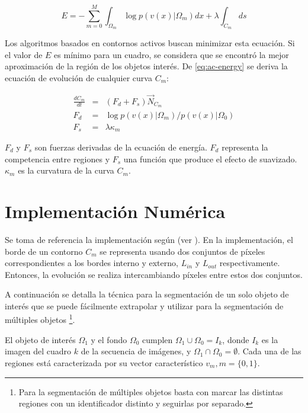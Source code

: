 \begin{equation}
    \label{eq:ac-energy}
    E = - \sum_{m=0}^{M}{\int_{\Omega_m}{\log{p(v(x) \vert \Omega_m)} dx} + \lambda \int_{C_m}{ds}}
\end{equation}

Los algoritmos basados en contornos activos buscan minimizar esta ecuación. Si
el valor de $E$ es mínimo para un cuadro, se considera que se encontró la mejor
aproximación de la región de los objetos interés. De \ref{eq:ac-energy} se
deriva la ecuación de evolución de cualquier curva $C_m$:

\begin{eqnarray}
    \frac{dC_m}{dt} &=& (F_d + F_s) \overrightarrow{N}_{C_m} \\
    F_d &=& \log{p(v(x) \vert \Omega_m) / p(v(x) \vert \Omega_0)} \\
    F_s &=& \lambda \kappa_m \label{eq:ac-formal}
\end{eqnarray}

$F_d$ y $F_s$ son fuerzas derivadas de la ecuación de energía. $F_d$ representa
la competencia entre regiones y $F_s$ una función que produce el efecto de
suavizado. $\kappa_m$ es la curvatura de la curva $C_m$.

\section{Implementación Numérica}
\label{sec:impl}

Se toma de referencia la implementación según \citeauthor{fast-level-set} (ver
\cite{fast-level-set}). En la implementación, el borde de un contorno $C_m$ se
representa usando dos conjuntos de píxeles correspondientes a los bordes
interno y externo, $L_{in}$ y $L_{out}$ respectivamente. Entonces, la evolución
se realiza intercambiando píxeles entre estos dos conjuntos.

A continuación se detalla la técnica para la segmentación de un solo objeto de
interés que se puede fácilmente extrapolar y utilizar para la segmentación de
múltiples objetos
\footnote{Para la segmentación de múltiples objetos basta con marcar las
distintas regiones con un identificador distinto y seguirlas por separado.}.

El objeto de interés $\Omega_{1}$ y el fondo $\Omega_{0}$ cumplen
$\Omega_{1}\cup\Omega_{0} = I_{k}$, donde $I_{k}$ es la imagen del cuadro $k$
de la secuencia de imágenes, y $\Omega_{1}\cap\Omega_{0} = \emptyset$. Cada una
de las regiones está caracterizada por su vector característico $v_{m}, m =
\{0,1\}$.

